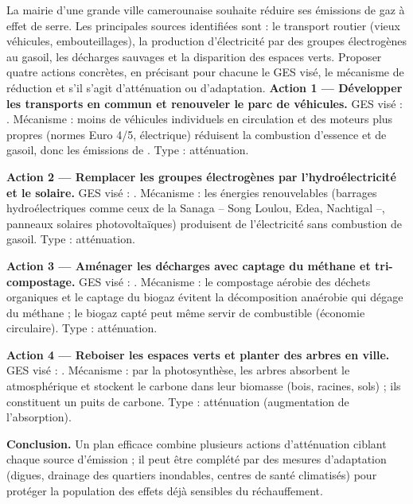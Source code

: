 \documentclass[11pt]{article}
\newcommand{\cle}[1]{{\popxbold\color{popdark}#1}}
\begin{document}
\begin{exoresolu}
La mairie d'une grande ville camerounaise souhaite réduire ses émissions de gaz à effet de serre. Les principales sources identifiées sont : le transport routier (vieux véhicules, embouteillages), la production d'électricité par des groupes électrogènes au gasoil, les décharges sauvages et la disparition des espaces verts.
Proposer quatre actions concrètes, en précisant pour chacune le GES visé, le mécanisme de réduction et s'il s'agit d'atténuation ou d'adaptation.
\tcblower
\textbf{Action 1 — Développer les transports en commun et renouveler le parc de véhicules.} GES visé : . Mécanisme : moins de véhicules individuels en circulation et des moteurs plus propres (normes Euro 4/5, électrique) réduisent la combustion d'essence et de gasoil, donc les émissions de . Type : \cle{atténuation}.

\textbf{Action 2 — Remplacer les groupes électrogènes par l'hydroélectricité et le solaire.} GES visé : . Mécanisme : les énergies renouvelables (barrages hydroélectriques comme ceux de la Sanaga -- Song Loulou, Edea, Nachtigal --, panneaux solaires photovoltaïques) produisent de l'électricité sans combustion de gasoil. Type : \cle{atténuation}.

\textbf{Action 3 — Aménager les décharges avec captage du méthane et tri-compostage.} GES visé : . Mécanisme : le compostage aérobie des déchets organiques et le captage du biogaz évitent la décomposition anaérobie qui dégage du méthane ; le biogaz capté peut même servir de combustible (économie circulaire). Type : \cle{atténuation}.

\textbf{Action 4 — Reboiser les espaces verts et planter des arbres en ville.} GES visé : . Mécanisme : par la \cle{photosynthèse}, les arbres absorbent le  atmosphérique et stockent le carbone dans leur biomasse (bois, racines, sols) ; ils constituent un \cle{puits de carbone}. Type : \cle{atténuation} (augmentation de l'absorption).

\textbf{Conclusion.} Un plan efficace combine plusieurs actions d'atténuation ciblant chaque source d'émission ; il peut être complété par des mesures d'adaptation (digues, drainage des quartiers inondables, centres de santé climatisés) pour protéger la population des effets déjà sensibles du réchauffement.
\end{exoresolu}
\end{document}
